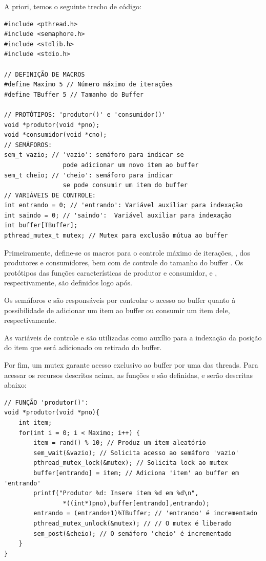\documentclass[
	12pt,				%
	openright,			%
	oneside,			%
	a4paper,			%
	chapter=TITLE,		%
	english,			%
	french,				%
	spanish,			%
	brazil				%
	]{abntex2}
\theoremstyle{definition}
\begin{document}
A priori, temos o seguinte trecho de código:
\begin{verbatim}
#include <pthread.h>
#include <semaphore.h>
#include <stdlib.h>
#include <stdio.h>

// DEFINIÇÃO DE MACROS
#define Maximo 5 // Número máximo de iterações
#define TBuffer 5 // Tamanho do Buffer

// PROTÓTIPOS: 'produtor()' e 'consumidor()' 
void *produtor(void *pno);
void *consumidor(void *cno);
// SEMÁFOROS:
sem_t vazio; // 'vazio': semáforo para indicar se 
                pode adicionar um novo item ao buffer
sem_t cheio; // 'cheio': semáforo para indicar 
                se pode consumir um item do buffer 
// VARIÁVEIS DE CONTROLE:
int entrando = 0; // 'entrando': Variável auxiliar para indexação
int saindo = 0; // 'saindo':  Variável auxiliar para indexação
int buffer[TBuffer]; 
pthread_mutex_t mutex; // Mutex para exclusão mútua ao buffer 
\end{verbatim}

Primeiramente, define-se os macros para o controle máximo de iterações, , dos produtores e consumidores, bem com de controle do tamanho do buffer . Os protótipos das funções características de produtor e consumidor,  e , respectivamente, são definidos logo após. 

Os semáforos  e  são responsáveis por controlar o acesso ao buffer quanto à possibilidade de adicionar um item ao buffer ou consumir um item dele, respectivamente.

As variáveis de controle  e  são utilizadas como auxílio para a indexação da posição do item que será adicionado ou retirado do buffer.

Por fim, um mutex  garante acesso exclusivo ao buffer por uma das threads. Para acessar os recursos descritos acima, as funções  e  são definidas, e serão descritas abaixo:

\begin{verbatim}
// FUNÇÃO 'produtor()':
void *produtor(void *pno){
    int item;
    for(int i = 0; i < Maximo; i++) {
        item = rand() % 10; // Produz um item aleatório
        sem_wait(&vazio); // Solicita acesso ao semáforo 'vazio'
        pthread_mutex_lock(&mutex); // Solicita lock ao mutex 
        buffer[entrando] = item; // Adiciona 'item' ao buffer em 'entrando'
        printf("Produtor %d: Insere item %d em %d\n", 
                *((int*)pno),buffer[entrando],entrando);
        entrando = (entrando+1)%TBuffer; // 'entrando' é incrementado 
        pthread_mutex_unlock(&mutex); // // O mutex é liberado
        sem_post(&cheio); // O semáforo 'cheio' é incrementado
    }
}
\end{verbatim}
\end{document}
